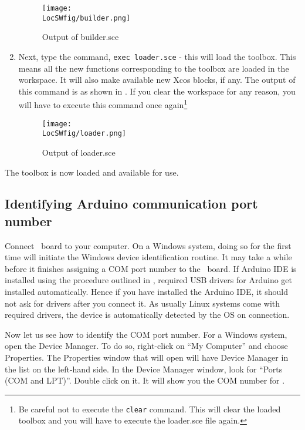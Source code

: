 \begin{enumerate}
            \begin{figure}
                  \centering
                  \texttt{[image: \\LocSWfig/builder.png]}
                  \caption{Output of builder.sce}
                  \label{builder}
            \end{figure}
      \item Next, type the command,
            {\tt exec loader.sce} -
            this will load the toolbox. This means all the new functions
            corresponding to the toolbox are loaded in the workspace. It
            will also make available new Xcos blocks, if any.  The
            output of this command is as shown in .  If you clear
            the workspace for any reason, you will have to execute this command
            once again\footnote{Be careful
                  not to execute the {\tt clear} command.  This will clear the loaded
                  toolbox and you will have to execute the loader.sce file again.}
            \begin{figure}
                  \centering
                  \texttt{[image: \\LocSWfig/loader.png]}
                  \caption{Output of loader.sce}
                  \label{loader}
            \end{figure}
\end{enumerate}
The toolbox is now loaded and available for use. 

\subsection{Identifying Arduino communication port number}

Connect \arduino\ board to your computer. On a Windows system, doing
so for the first time will initiate the Windows device identification
routine. It may take a while before it finishes assigning a COM port
number to the \arduino\ board.  If Arduino IDE is installed using the
procedure outlined in , required USB drivers for
Arduino get installed automatically.  Hence if you have installed the
Arduino IDE, it should not ask for drivers after you connect it.  As
usually Linux systems come with required drivers, the device is
automatically detected by the OS on connection.

Now let us see how to identify the COM port number. For a Windows
system, open the Device Manager. To do so, right-click on ``My
Computer'' and choose Properties. The Properties window that will open
will have Device Manager in the list on the left-hand side. In the
Device Manager window, look for ``Ports (COM and LPT)''. Double click on
it. It will show you the COM number for \arduino. 

